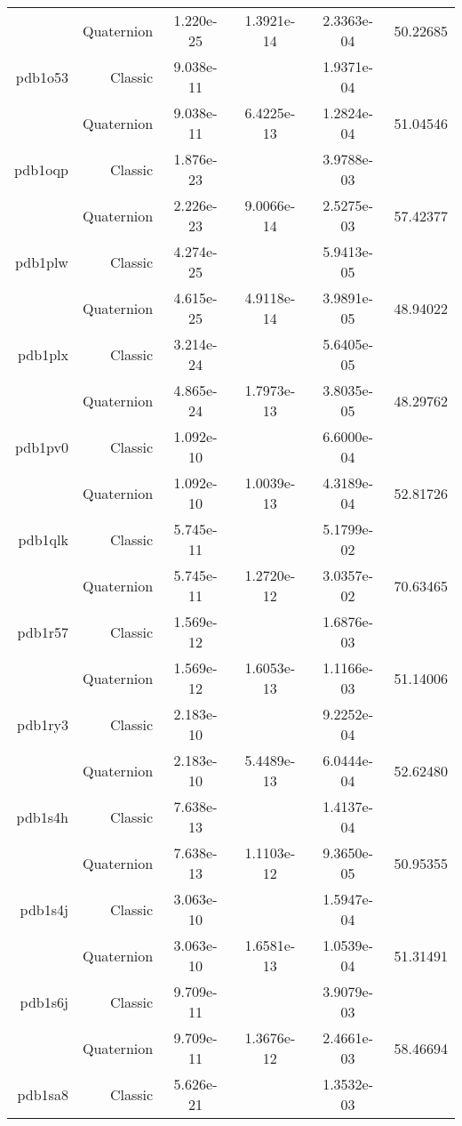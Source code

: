\begin{xltabular}{\textwidth}{r|rS[table-format=1.3e+2]S[table-format=1.4e+2]S[table-format=1.4e+2]S[table-format=-1.5]}
& Quaternion & 1.220e-25 & 1.3921e-14 & 2.3363e-04 & 50.22685\\  \addlinespace
pdb1o53 & Classic & 9.038e-11 &  & 1.9371e-04 & \\
& Quaternion & 9.038e-11 & 6.4225e-13 & 1.2824e-04 & 51.04546\\  \addlinespace
pdb1oqp & Classic & 1.876e-23 &  & 3.9788e-03 & \\
& Quaternion & 2.226e-23 & 9.0066e-14 & 2.5275e-03 & 57.42377\\  \addlinespace
pdb1plw & Classic & 4.274e-25 &  & 5.9413e-05 & \\
& Quaternion & 4.615e-25 & 4.9118e-14 & 3.9891e-05 & 48.94022\\  \addlinespace
pdb1plx & Classic & 3.214e-24 &  & 5.6405e-05 & \\
& Quaternion & 4.865e-24 & 1.7973e-13 & 3.8035e-05 & 48.29762\\  \addlinespace
pdb1pv0 & Classic & 1.092e-10 &  & 6.6000e-04 & \\
& Quaternion & 1.092e-10 & 1.0039e-13 & 4.3189e-04 & 52.81726\\  \addlinespace
pdb1qlk & Classic & 5.745e-11 &  & 5.1799e-02 & \\
& Quaternion & 5.745e-11 & 1.2720e-12 & 3.0357e-02 & 70.63465\\  \addlinespace
pdb1r57 & Classic & 1.569e-12 &  & 1.6876e-03 & \\
& Quaternion & 1.569e-12 & 1.6053e-13 & 1.1166e-03 & 51.14006\\  \addlinespace
pdb1ry3 & Classic & 2.183e-10 &  & 9.2252e-04 & \\
& Quaternion & 2.183e-10 & 5.4489e-13 & 6.0444e-04 & 52.62480\\  \addlinespace
pdb1s4h & Classic & 7.638e-13 &  & 1.4137e-04 & \\
& Quaternion & 7.638e-13 & 1.1103e-12 & 9.3650e-05 & 50.95355\\  \addlinespace
pdb1s4j & Classic & 3.063e-10 &  & 1.5947e-04 & \\
& Quaternion & 3.063e-10 & 1.6581e-13 & 1.0539e-04 & 51.31491\\  \addlinespace
pdb1s6j & Classic & 9.709e-11 &  & 3.9079e-03 & \\
& Quaternion & 9.709e-11 & 1.3676e-12 & 2.4661e-03 & 58.46694\\  \addlinespace
pdb1sa8 & Classic & 5.626e-21 &  & 1.3532e-03 & \\

\end{xltabular}
